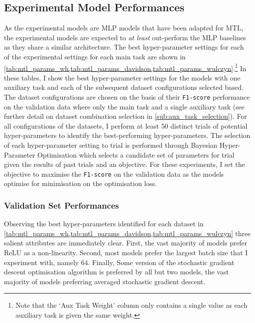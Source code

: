 \subsection{Experimental Model Performances}
As the experimental models are MLP models that have been adapted for MTL, the experimental models are expected to \textit{at least} out-perform the MLP baselines as they share a similar architecture.
The best hyper-parameter settings for each of the experimental settings for each main task are shown in \cref{tab:mtl_params_wh,tab:mtl_params_davidson,tab:mtl_params_wulczyn}.\footnote{Note that the `Aux Task Weight' column only contains a single value as each auxiliary task is given the same weight.}
In these tables, I show the best hyper-parameter settings for the models with one auxiliary task and each of the subsequent dataset configurations selected based.
The dataset configurations are chosen on the basis of their \texttt{F1-score} performance on the validation data where only the main task and a single auxiliary task (see further detail on dataset combination selection in \cref{sub:aux_task_selection}).
For all configurations of the datasets, I perform at least $50$ distinct trials of potential hyper-parameters to identify the best-performing hyper-parameters.
The selection of each hyper-parameter setting to trial is performed through Bayesian Hyper-Parameter Optimisation which selects a candidate set of parameters for trial given the results of past trials and an objective.
For these experiments, I set the objective to maximise the \texttt{F1-score} on the validation data as the models optimise for minimisation on the optimisation loss.

\subsubsection{Validation Set Performances}

Observing the best hyper-parameters identified for each dataset in \cref{tab:mtl_params_wh,tab:mtl_params_davidson,tab:mtl_params_wulczyn} three salient attributes are immediately clear.
First, the vast majority of models prefer ReLU as a non-linearity.
Second, most models prefer the largest batch size that I experiment with, namely $64$.
Finally, Some version of the stochastic gradient descent optimisation algorithm is preferred by all but two models, the vast majority of models preferring averaged stochastic gradient descent.

